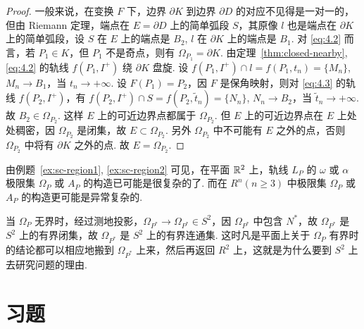 \begin{proof}
一般来说，在变换 $F$ 下，边界 $\partial K$ 到边界 $\partial D$ 的对应不见得是一对一的，但由 Riemann 定理，端点在 $E = \partial D$ 上的简单弧段 $S$，其原像 $l$ 也是端点在 $\partial K$ 上的简单弧段，设 $S$ 在 $E$ 上的端点是 $B_2$, $l$ 在 $\partial K$ 上的端点是 $B_1$. 对 \eqref{eq:4.2} 而言，若 $P_1 \in K$，但 $P_1$ 不是奇点，则有 $\Omega_{P_1} = \partial K$. 由定理~\ref{thm:closed-nearby}, \eqref{eq:4.2} 的轨线 $f(P_1, I^+)$ 绕 $\partial K$ 盘旋. 设 $f(P_1, I^+) \cap l = f(P_1, t_n) = \{M_n\}$, $M_n \to B_1$，当 $t_n \to +\infty$. 设 $F(P_1) = P_2$，因 $F$ 是保角映射，则对 \eqref{eq:4.3} 的轨线 $f(P_2, I^+)$，有 $f(P_2, I^+) \cap S = f(P_2, \tilde t_n) = \{N_n\}$, $N_n \to B_2$，当 $\tilde t_n \to +\infty$. 故 $B_2 \in \Omega_{P_2}$. 这样 $E$ 上的可近边界点都属于 $\Omega_{P_2}$. 但 $E$ 上的可近边界点在 $E$ 上处处稠密，因 $\Omega_{P_2}$ 是闭集，故 $E \subset \Omega_{P_2}$. 另外 $\Omega_{P_2}$ 中不可能有 $E$ 之外的点，否则 $\Omega_{P_2}$ 中将有 $\partial K$ 之外的点. 故 $E = \Omega_{P_2}$.
\end{proof}

由例题~\ref{ex:sc-region1}, \ref{ex:sc-region2} 可见，在平面 $\mathbb{R}^2$ 上，轨线 $L_P$ 的 $\omega$ 或 $\alpha$ 极限集 $\Omega_P$ 或 $A_P$ 的构造已可能是很复杂的了. 而在 $R^n (n \geq 3)$ 中极限集 $\Omega_P$ 或 $A_P$ 的构造更可能是异常复杂的.

当 $\Omega_P$ 无界时，经过测地投影，$\Omega_{P^*} \to \Omega_{P^*} \in S^2$，因 $\Omega_{P^*}$ 中包含 $N^*$，故 $\Omega_{P^*}$ 是 $S^2$ 上的有界闭集，故 $\Omega_{P^*}$ 是 $S^2$ 上的有界连通集. 这时凡是平面上关于 $\Omega_P$ 有界时的结论都可以相应地搬到 $\Omega_{P^*}$ 上来，然后再返回 $R^2$ 上，这就是为什么要到 $S^2$ 上去研究问题的理由.

\section*{习题}

